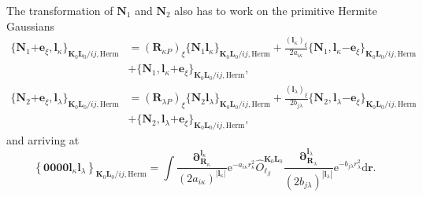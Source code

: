 \documentclass[a4paper,11pt,twoside,openright]{book}
\begin{document}
The transformation of $\boldsymbol{N}_{1}$ and $\boldsymbol{N}_{2}$ also has to work on
the primitive Hermite Gaussians~\cite{bgkrth-a}
\begin{align}
  \label{eq:recurrence-phase-herm-bra}
  \{\boldsymbol{N}_{1}\mathrm{+}\boldsymbol{e}_{\xi},%
    \boldsymbol{l}_{\kappa}\}_{\boldsymbol{K}_{0}\boldsymbol{L}_{0}/ij,\text{Herm}}
  &=(\boldsymbol{R}_{\kappa P})_{\xi}%
    \{\boldsymbol{N}_{1}\boldsymbol{l}_{\kappa}\}_{\boldsymbol{K}_{0}\boldsymbol{L}_{0}/ij,\text{Herm}}%
  +\frac{(\boldsymbol{l}_{\kappa})_{\xi}}{2a_{i\kappa}}%
    \{\boldsymbol{N}_{1},\boldsymbol{l}_{\kappa}%
      \mathrm{-}\boldsymbol{e}_{\xi}\}_{\boldsymbol{K}_{0}\boldsymbol{L}_{0}/ij,\text{Herm}}\\
  &+\{\boldsymbol{N}_{1},\boldsymbol{l}_{\kappa}%
    \mathrm{+}\boldsymbol{e}_{\xi}\}_{\boldsymbol{K}_{0}\boldsymbol{L}_{0}/ij,\text{Herm}},\nonumber
\end{align}
%
\begin{align}
  \label{eq:recurrence-phase-herm-ket}
  \{\boldsymbol{N}_{2}\mathrm{+}\boldsymbol{e}_{\xi},%
    \boldsymbol{l}_{\lambda}\}_{\boldsymbol{K}_{0}\boldsymbol{L}_{0}/ij,\text{Herm}}
  &=(\boldsymbol{R}_{\lambda P})_{\xi}%
    \{\boldsymbol{N}_{2}\boldsymbol{l}_{\lambda}\}_{\boldsymbol{K}_{0}\boldsymbol{L}_{0}/ij,\text{Herm}}%
  +\frac{(\boldsymbol{l}_{\lambda})_{\xi}}{2b_{j\lambda}}%
    \{\boldsymbol{N}_{2},\boldsymbol{l}_{\lambda}%
      \mathrm{-}\boldsymbol{e}_{\xi}\}_{\boldsymbol{K}_{0}\boldsymbol{L}_{0}/ij,\text{Herm}}\\
  &+\{\boldsymbol{N}_{2},\boldsymbol{l}_{\lambda}%
    \mathrm{+}\boldsymbol{e}_{\xi}\}_{\boldsymbol{K}_{0}\boldsymbol{L}_{0}/ij,\text{Herm}},\nonumber
\end{align}
and arriving at~\cite{bgkrth-a}
\begin{equation}
  \left\{\boldsymbol{0000}%
    \boldsymbol{l}_{\kappa}\boldsymbol{l}_{\lambda}\right\}_{\boldsymbol{K}_{0}\boldsymbol{L}_{0}/ij,\text{Herm}}
  =\int\frac{\boldsymbol{\partial}_{\boldsymbol{R}_{\kappa}}^{\boldsymbol{l}_{\kappa}}}%
      {(2a_{i\kappa})^{|\boldsymbol{l}_{\kappa}|}}\mathrm{e}^{-a_{i\kappa}r_{\kappa}^2}%
    \hat{O}_{\ell_{\beta}}^{\boldsymbol{K}_{0}\boldsymbol{L}_{0}}%
    \frac{\boldsymbol{\partial}_{\boldsymbol{R}_{\lambda}}^{\boldsymbol{l}_{\lambda}}}%
      {(2b_{j\lambda})^{|\boldsymbol{l}_{\lambda}|}}%
    \mathrm{e}^{-b_{j\lambda}r_{\lambda}^2}\mathrm{d}\boldsymbol{r}.
\end{equation}
\end{document}
